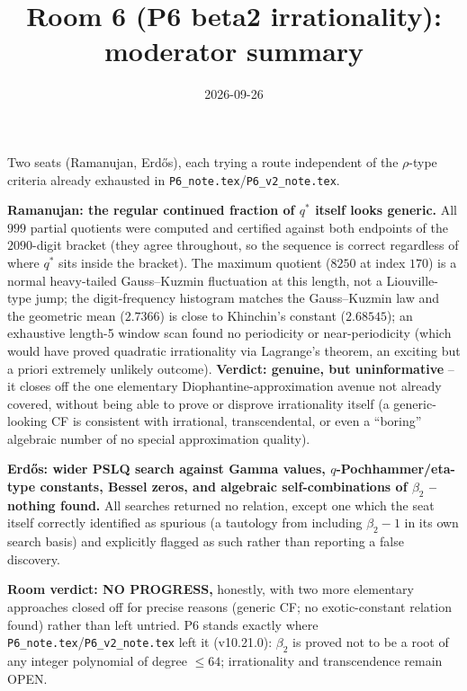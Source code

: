 \documentclass[11pt]{article}
\title{Room 6 (P6 beta2 irrationality): moderator summary}
\date{2026-09-26}
\begin{document}
\maketitle

Two seats (Ramanujan, Erd\H os), each trying a route independent of the $\rho$-type criteria
already exhausted in \texttt{P6\_note.tex}/\texttt{P6\_v2\_note.tex}.

\textbf{Ramanujan: the regular continued fraction of $q^\ast$ itself looks generic.} All $999$
partial quotients were computed and certified against both endpoints of the $2090$-digit bracket
(they agree throughout, so the sequence is correct regardless of where $q^\ast$ sits inside the
bracket). The maximum quotient ($8250$ at index $170$) is a normal heavy-tailed Gauss--Kuzmin
fluctuation at this length, not a Liouville-type jump; the digit-frequency histogram matches the
Gauss--Kuzmin law and the geometric mean ($2.7366$) is close to Khinchin's constant ($2.68545$); an
exhaustive length-5 window scan found no periodicity or near-periodicity (which would have proved
quadratic irrationality via Lagrange's theorem, an exciting but a priori extremely unlikely
outcome). \textbf{Verdict: genuine, but uninformative} -- it closes off the one elementary
Diophantine-approximation avenue not already covered, without being able to prove or disprove
irrationality itself (a generic-looking CF is consistent with irrational, transcendental, or even
a ``boring'' algebraic number of no special approximation quality).

\textbf{Erd\H os: wider PSLQ search against Gamma values, $q$-Pochhammer/eta-type constants,
Bessel zeros, and algebraic self-combinations of $\beta_2$ -- nothing found.} All searches returned
no relation, except one which the seat itself correctly identified as spurious (a tautology from
including $\beta_2-1$ in its own search basis) and explicitly flagged as such rather than reporting
a false discovery.

\textbf{Room verdict: NO PROGRESS,} honestly, with two more elementary approaches closed off for
precise reasons (generic CF; no exotic-constant relation found) rather than left untried. P6 stands
exactly where \texttt{P6\_note.tex}/\texttt{P6\_v2\_note.tex} left it (v10.21.0): $\beta_2$ is
proved not to be a root of any integer polynomial of degree $\le64$; irrationality and
transcendence remain OPEN.
\end{document}
